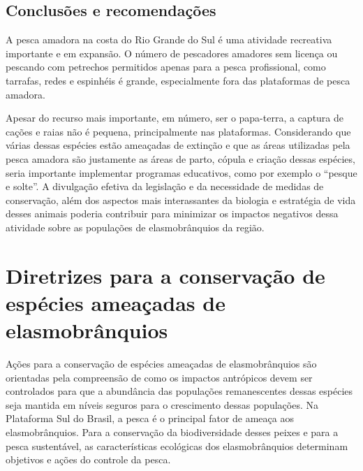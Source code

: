 \documentclass[a4paper,11pt,twoside,showtrims,onecolumn,openright,final]{memoir}
\begin{document}
\section*{Conclusões e recomendações}

A pesca amadora na costa do Rio Grande do Sul é uma atividade recreativa importante e em expansão.
O número de pescadores amadores sem licença ou pescando com petrechos permitidos apenas para a pesca profissional,
como tarrafas, redes e espinhéis é grande, especialmente fora das plataformas de pesca amadora.

Apesar do recurso mais importante, em número, ser o papa-terra, a captura de cações e raias não é pequena,
principalmente nas plataformas. Considerando que várias dessas espécies estão ameaçadas de extinção e que 
as áreas utilizadas pela pesca amadora são justamente as áreas de parto, cópula e criação dessas espécies,
seria importante implementar programas educativos, como por exemplo o ``pesque e solte''. A divulgação
efetiva da legislação e da necessidade de medidas de conservação, além dos aspectos mais interassantes 
da biologia e estratégia de vida desses animais poderia contribuir para minimizar os impactos negativos
dessa atividade sobre as populações de elasmobrânquios da região.


\chapter[Diretrizes para a conservação de espécies ameaçadas de \mbox{elasmobrânquios}]
        {Diretrizes para a conservação de espécies ameaçadas de elasmobrânquios}\label{chap:diretrizes}




\newpage

Ações para a conservação de espécies ameaçadas de elasmobrânquios são orientadas 
pela compreensão de como os impactos antrópicos devem ser controlados para que a 
abundância das populações remanescentes dessas espécies seja mantida em níveis seguros 
para o crescimento dessas populações. Na Plataforma Sul do Brasil, a pesca é o principal 
fator de ameaça  aos elasmobrânquios. Para a conservação da biodiversidade desses peixes 
e para a pesca sustentável, as características ecológicas dos elasmobrânquios determinam 
objetivos e ações do controle da pesca.
\end{document}
